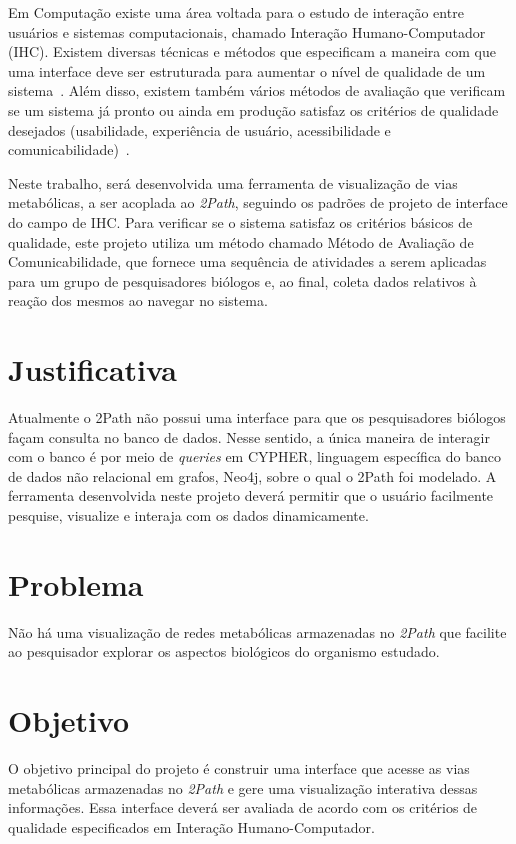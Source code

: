 \indent Em Computação existe uma área voltada para o estudo de interação entre usuários e sistemas computacionais, chamado Interação Humano-Computador (IHC). Existem diversas técnicas e métodos que especificam a maneira com que uma interface deve ser estruturada para aumentar o nível de qualidade de um sistema~\cite{IHCbook}. Além disso, existem também vários métodos de avaliação que verificam se um sistema já pronto ou ainda em produção satisfaz os critérios de qualidade desejados (usabilidade, experiência de usuário, acessibilidade e comunicabilidade)~\cite{IHCbook}.

\indent Neste trabalho, será desenvolvida uma ferramenta de visualização de vias metabólicas, a ser acoplada ao \textit{2Path}, seguindo os padrões de projeto de interface do campo de IHC. Para verificar se o sistema satisfaz os critérios básicos de qualidade, este projeto utiliza um método chamado Método de Avaliação de Comunicabilidade, que fornece uma sequência de atividades a serem aplicadas para um grupo de pesquisadores biólogos e, ao final, coleta dados relativos à reação dos mesmos ao navegar no sistema.


\section{Justificativa}
\indent Atualmente o 2Path não possui uma interface para que os pesquisadores biólogos façam consulta no banco de dados. Nesse sentido, a única maneira de interagir com o banco é por meio de \textit{queries} em CYPHER, linguagem específica do banco de dados não relacional em grafos, Neo4j, sobre o qual o 2Path foi modelado. A ferramenta desenvolvida neste projeto deverá permitir que o usuário facilmente pesquise, visualize e interaja com os dados dinamicamente.

\section{Problema}
\indent Não há uma visualização de redes metabólicas armazenadas no \textit{2Path} que facilite ao pesquisador explorar os aspectos biológicos do organismo estudado.

\section{Objetivo}
\indent O objetivo principal do projeto é construir uma interface que acesse as vias metabólicas armazenadas no \textit{2Path} e gere uma visualização interativa dessas informações. Essa interface deverá ser avaliada de acordo com os critérios de qualidade especificados em Interação Humano-Computador.

